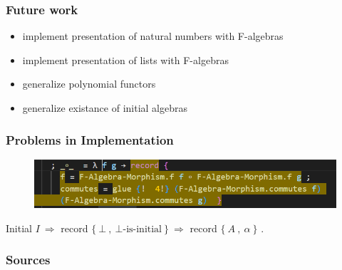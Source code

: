 \documentclass{beamer}
\begin{document}
\begin{frame}
\frametitle{Future work}
\begin{itemize}
\item implement presentation of natural numbers with F-algebras
\item implement presentation of lists with F-algebras
\item generalize polynomial functors
\item generalize existance of initial algebras
\end{itemize}


\end{frame}
\begin{frame}
\frametitle{Problems in Implementation}

\pause

\begin{figure}[h]
\includegraphics[width=12cm]{yellow.PNG}
\end{figure}

\pause

Initial $I\ \Rightarrow$ record $\{\ \bot \ ,\ \bot \text{-is-initial}\ \}\ \Rightarrow$ record $\{\ A \ ,\ \alpha \ \}$ .

\end{frame}

\begin{frame}
  \frametitle{Sources}
  \nocite{*}
  \printbibliography
\end{frame}



\end{document}
